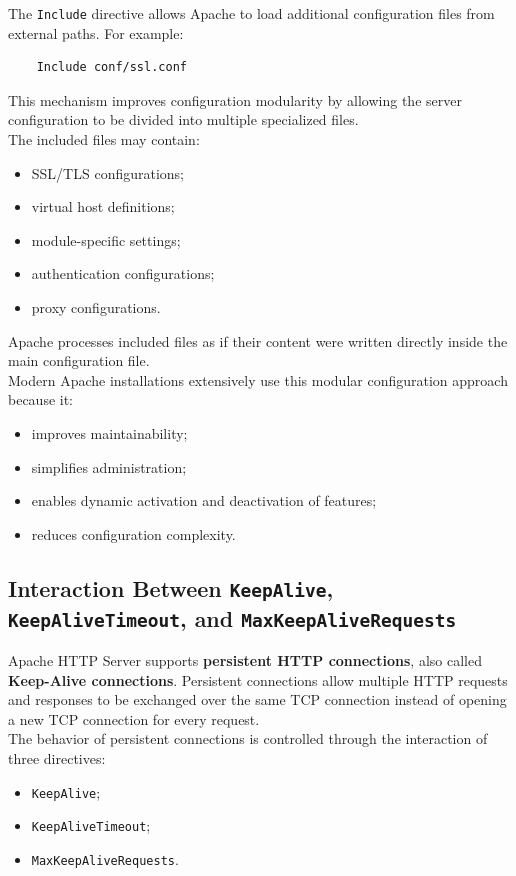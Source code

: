 \documentclass{scrbook}
\begin{document}
	The \texttt{Include} directive allows Apache to load additional configuration files from external paths. For example:
	\begin{lstlisting}
	Include conf/ssl.conf
	\end{lstlisting}
	
	This mechanism improves configuration modularity by allowing the server configuration to be divided into multiple specialized files.\\
	
	The included files may contain:
	\begin{itemize}
		\item SSL/TLS configurations;
		\item virtual host definitions;
		\item module-specific settings;
		\item authentication configurations;
		\item proxy configurations.
	\end{itemize}
	
	Apache processes included files as if their content were written directly inside the main configuration file.\\
	
	Modern Apache installations extensively use this modular configuration approach because it:
	\begin{itemize}
		\item improves maintainability;
		\item simplifies administration;
		\item enables dynamic activation and deactivation of features;
		\item reduces configuration complexity.
	\end{itemize}
	
	\subsection{Interaction Between \texttt{KeepAlive}, \texttt{KeepAliveTimeout}, and \texttt{MaxKeepAliveRequests}}
	
	Apache HTTP Server supports \textbf{persistent HTTP connections}, also called \textbf{Keep-Alive connections}. Persistent connections allow multiple HTTP requests and responses to be exchanged over the same TCP connection instead of opening a new TCP connection for every request.\\
	
	The behavior of persistent connections is controlled through the interaction of three directives:
	\begin{itemize}
		\item \texttt{KeepAlive};
		\item \texttt{KeepAliveTimeout};
		\item \texttt{MaxKeepAliveRequests}.
	\end{itemize}
	
\end{document}
